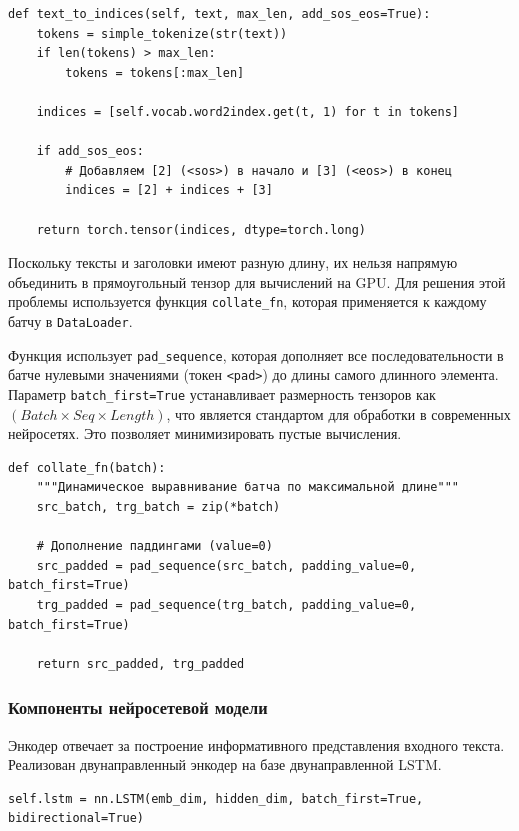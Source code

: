 \documentclass[coursework]{SCWorks}
\begin{document}
    \begin{verbatim}
def text_to_indices(self, text, max_len, add_sos_eos=True):
    tokens = simple_tokenize(str(text))
    if len(tokens) > max_len:
        tokens = tokens[:max_len]

    indices = [self.vocab.word2index.get(t, 1) for t in tokens]

    if add_sos_eos:
        # Добавляем [2] (<sos>) в начало и [3] (<eos>) в конец
        indices = [2] + indices + [3]

    return torch.tensor(indices, dtype=torch.long)
    \end{verbatim}

    Поскольку тексты и заголовки имеют разную длину, их нельзя напрямую объединить в прямоугольный тензор для вычислений на GPU.
    Для решения этой проблемы используется функция \texttt{collate\_fn}, которая применяется к каждому батчу в \texttt{DataLoader}.

    Функция использует \texttt{pad\_sequence}, которая дополняет все последовательности в батче нулевыми значениями (токен \texttt{<pad>})
    до длины самого длинного элемента.
    Параметр \texttt{batch\_first=True} устанавливает размерность тензоров как $(Batch \times Seq \times Length)$,
    что является стандартом для обработки в современных нейросетях.
    Это позволяет минимизировать пустые вычисления.

    \begin{verbatim}
def collate_fn(batch):
    """Динамическое выравнивание батча по максимальной длине"""
    src_batch, trg_batch = zip(*batch)

    # Дополнение паддингами (value=0)
    src_padded = pad_sequence(src_batch, padding_value=0, batch_first=True)
    trg_padded = pad_sequence(trg_batch, padding_value=0, batch_first=True)

    return src_padded, trg_padded
    \end{verbatim}

    \subsubsection{Компоненты нейросетевой модели}


    Энкодер отвечает за построение информативного представления входного текста.
    Реализован двунаправленный энкодер на базе двунаправленной LSTM.

    \begin{verbatim}
self.lstm = nn.LSTM(emb_dim, hidden_dim, batch_first=True, bidirectional=True)
    \end{verbatim}
\end{document}
